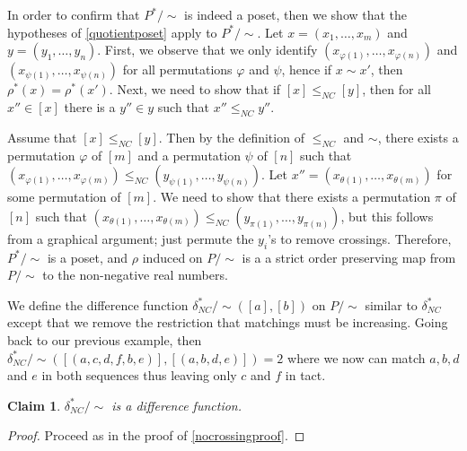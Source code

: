\documentclass[acmsmall,review,anonymous]{acmart}\settopmatter{printfolios=true,printccs=false,printacmref=false}
\newtheorem{claim}{Claim}
\begin{document}
In order to confirm that $P^*/{\sim}$ is indeed a poset, then we show that the
hypotheses of \cref{quotientposet} apply to $P^*/{\sim}$. Let $x=(x_1, \ldots,
x_m)$ and $y = (y_1, \ldots, y_n)$. First, we observe that we only identify
$(x_{\varphi(1)}, \ldots, x_{\varphi(n)})$ and $(x_{\psi(1)}, \ldots,
x_{\psi(n)})$ for all permutations $\varphi$ and $\psi$, hence if $x \sim x'$,
then $\rho^*(x) = \rho^*(x')$. Next, we need to show that if $[x] \leq_{NC}
[y]$, then for all $x'' \in [x]$ there is a $y'' \in y$ such that $x''
\leq_{NC} y''$.

Assume that $[x] \leq_{NC} [y]$. Then by the definition of $\leq_{NC}$ and
$\sim$, there exists a permutation $\varphi$ of $[m]$ and a permutation
$\psi$ of $[n]$ such that $(x_{\varphi(1)}, \ldots, x_{\varphi(m)}) \leq_{NC}
(y_{\psi(1)}, \ldots, y_{\psi(n)})$.  Let $x'' = (x_{\theta(1)}, \ldots,
x_{\theta(m)})$ for some permutation of $[m]$. We need to show that there
exists a permutation $\pi$ of $[n]$ such that $(x_{\theta(1)}, \ldots,
x_{\theta(m)}) \leq_{NC} (y_{\pi(1)}, \ldots, y_{\pi(n)})$, but this follows
from a graphical argument; just permute the $y_i$'s to remove crossings.
Therefore, $P^*/{\sim}$ is a poset, and $\rho$ induced on $P/{\sim}$ is a
a strict order preserving map from $P/{\sim}$ to the non-negative real numbers.

We define the difference function $\delta_{NC}^*/{\sim}([a], [b])$ on $P/{\sim}$
similar to $\delta^*_{NC}$ except that we remove the restriction that matchings
must be increasing. Going back to our previous example, then
$\delta_{NC}^*/{\sim}([(a, c, d, f, b, e)], [(a, b, d, e)]) = 2$ where we now
can match $a, b, d$ and $e$ in both sequences thus leaving only $c$ and $f$ in
tact.
\begin{claim}
$\delta_{NC}^*/{\sim}$ is a difference function.
\end{claim}
\begin{proof}
Proceed as in the proof of \cref{nocrossingproof}.
\end{proof}
\end{document}
